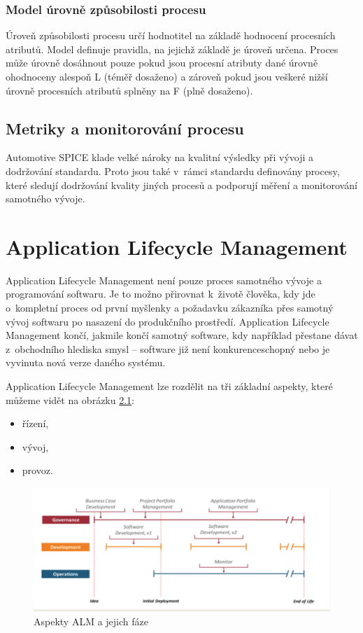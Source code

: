 \documentclass[czech,master]{diploma}
\begin{document}
\subsection{Model úrovně způsobilosti procesu}
Úroveň způsobilosti procesu určí hodnotitel na základě hodnocení procesních atributů. Model definuje  pravidla, na jejichž základě je úroveň určena. Proces může úrovně dosáhnout pouze pokud jsou procesní atributy dané úrovně ohodnoceny alespoň L (téměř dosaženo) a zároveň pokud jsou veškeré nižší úrovně procesních atributů splněny na F (plně dosaženo).


\section{Metriky a monitorování procesu}
Automotive SPICE klade velké nároky na kvalitní výsledky při vývoji a dodržování standardu. Proto jsou také v~rámci standardu definovány procesy, které sledují dodržování kvality jiných procesů a podporují měření a monitorování samotného vývoje.



\chapter{Application Lifecycle Management}
\label{sec:alm}
Application Lifecycle Management není pouze proces samotného vývoje a programování softwaru. Je to možno přirovnat k~životě člověka, kdy jde o~kompletní proces od první myšlenky a požadavku zákazníka přes samotný vývoj softwaru po nasazení do produkčního prostředí. Application Lifecycle Management končí, jakmile končí samotný software, kdy například přestane dávat z~obchodního hlediska smysl -- software již není konkurenceschopný nebo je vyvinuta nová verze daného systému. \cite{alm_chappell}

Application Lifecycle Management lze rozdělit na tři základní aspekty, které můžeme vidět na obrázku \ref{fig:alm}:

\begin{itemize}
  \item řízení,
  \item vývoj,
  \item provoz.
\end{itemize}

\begin{figure}[!ht]
    \centering
    \includegraphics[width=1\textwidth]{Diplomka/Figures/alm.png}
    \caption{Aspekty ALM a jejich fáze \cite{alm_chappell}}
    \label{fig:alm}
\end{figure}
\end{document}
